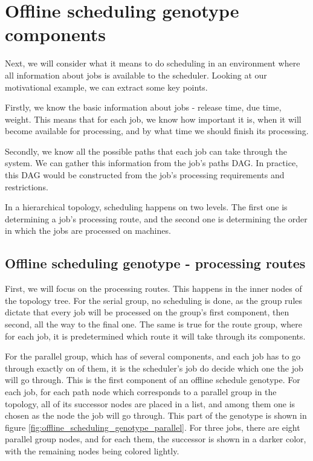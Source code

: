 \section{Offline scheduling genotype components}
\label{sec:offline_scheduling_genotype_components}

Next, we will consider what it means to do scheduling in an environment where all information about jobs is available to the scheduler. Looking at our motivational example, we can extract some key points.

Firstly, we know the basic information about jobs - release time, due time, weight. This means that for each job, we know how important it is, when it will become available for processing, and by what time we should finish its processing.

Secondly, we know all the possible paths that each job can take through the system. We can gather this information from the job's paths DAG. In practice, this DAG would be constructed from the job's processing requirements and restrictions.

In a hierarchical topology, scheduling happens on two levels. The first one is determining a job's processing route, and the second one is determining the order in which the jobs are processed on machines.

\subsection{Offline scheduling genotype - processing routes}

First, we will focus on the processing routes. This happens in the inner nodes of the topology tree. For the serial group, no scheduling is done, as the group rules dictate that every job will be processed on the group's first component, then second, all the way to the final one. The same is true for the route group, where for each job, it is predetermined which route it will take through its components.

For the parallel group, which has of several components, and each job has to go through exactly on of them, it is the scheduler's job do decide which one the job will go through. This is the first component of an offline schedule genotype. For each job, for each path node which corresponds to a parallel group in the topology, all of its successor nodes are placed in a list, and among them one is chosen as the node the job will go through. This part of the genotype is shown in figure \ref{fig:offline_scheduling_genotype_parallel}. For three jobs, there are eight parallel group nodes, and for each them, the successor is shown in a darker color, with the remaining nodes being colored lightly.

